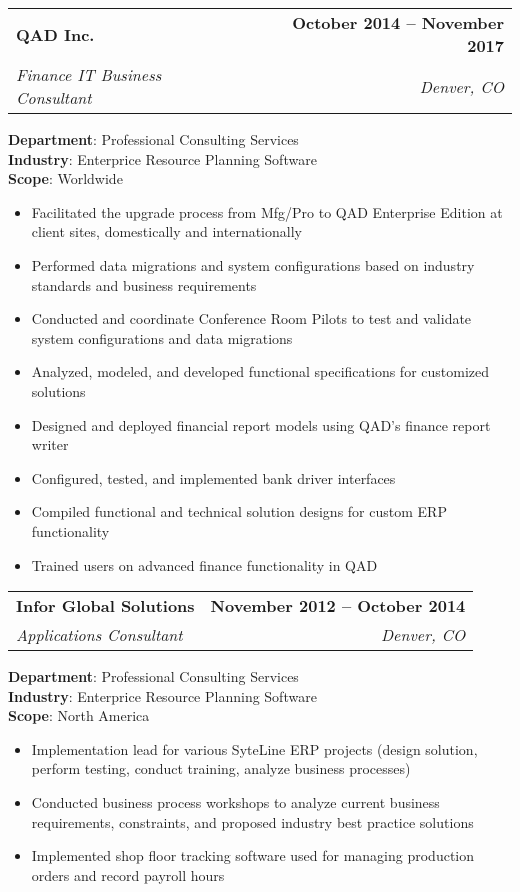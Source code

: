 \documentclass[letterpaper,11pt]{article}
\makeatletter
\newcommand{\resumeItem}[1]{
  \item\small{
    {#1 \vspace{-2pt}}
  }
}
\newcommand{\resumeSubheading}[4]{
  \vspace{-2pt}\item
    \begin{tabular*}{1.0\textwidth}[t]{l@{\extracolsep{\fill}}r}
      \textbf{#1} & \textbf{\small #2} \\
      \textit{\small#3} & \textit{\small #4} \\
    \end{tabular*}\vspace{-7pt}
}
\newcommand{\resumeItemListStart}{\begin{itemize}}
\newcommand{\resumeItemListEnd}{\end{itemize}\vspace{-5pt}}
\makeatother
\begin{document}
    \resumeSubheading
      {QAD Inc.}{October 2014 -- November 2017}
      {Finance IT Business Consultant}{Denver, CO}
      \begin{itemize}[leftmargin=0.15in, label={}]
        \small{\item{
         \textbf{Department}{: Professional Consulting Services} \\
         \textbf{Industry}{: Enterprice Resource Planning Software} \\
         \textbf{Scope}{: Worldwide} \\
         }}
     \end{itemize}
      \resumeItemListStart
        \resumeItem{Facilitated the upgrade process from Mfg/Pro to QAD Enterprise Edition at client sites, domestically and internationally}
        \resumeItem{Performed data migrations and system configurations based on industry standards and business requirements}
        \resumeItem{Conducted and coordinate Conference Room Pilots to test and validate system configurations and data migrations}
        \resumeItem{Analyzed, modeled, and developed functional specifications for customized solutions}
        \resumeItem{Designed and deployed financial report models using QAD’s finance report writer}
        \resumeItem{Configured, tested, and implemented bank driver interfaces}
        \resumeItem{Compiled functional and technical solution designs for custom ERP functionality}
        \resumeItem{Trained users on advanced finance functionality in QAD}
      \resumeItemListEnd

    \resumeSubheading
      {Infor Global Solutions}{November 2012 -- October 2014}
      {Applications Consultant}{Denver, CO}
      \begin{itemize}[leftmargin=0.15in, label={}]
        \small{\item{
         \textbf{Department}{: Professional Consulting Services} \\
         \textbf{Industry}{: Enterprice Resource Planning Software} \\
         \textbf{Scope}{: North America} \\
         }}
     \end{itemize}
      \resumeItemListStart
        \resumeItem{Implementation lead for various SyteLine ERP projects (design solution, perform testing, conduct training, analyze business processes)}
        \resumeItem{Conducted business process workshops to analyze current business requirements, constraints, and proposed industry best practice solutions}
        \resumeItem{Implemented shop floor tracking software used for managing production orders and record payroll hours}
      \resumeItemListEnd
\end{document}
